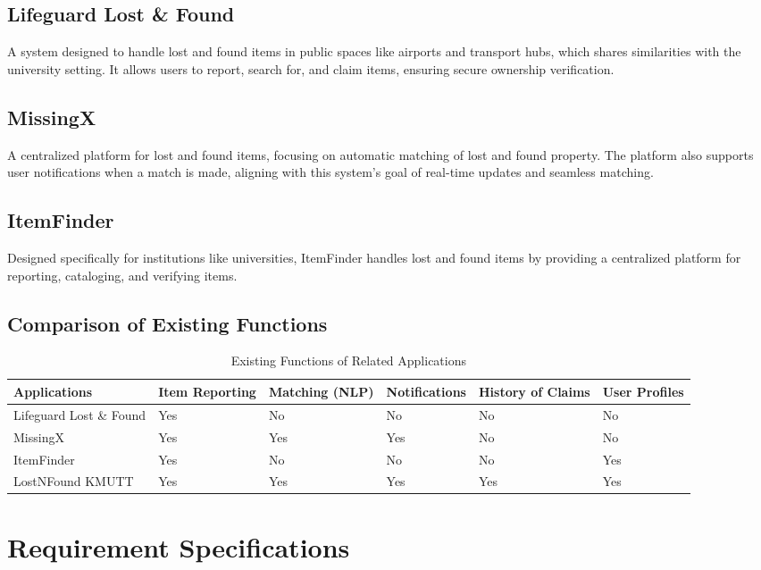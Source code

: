 \subsection{Lifeguard Lost \& Found}
A system designed to handle lost and found items in public spaces like airports and transport hubs, which shares similarities with the university setting. It allows users to report, search for, and claim items, ensuring secure ownership verification.

\subsection{MissingX}
A centralized platform for lost and found items, focusing on automatic matching of lost and found property. The platform also supports user notifications when a match is made, aligning with this system’s goal of real-time updates and seamless matching.

\subsection{ItemFinder}
Designed specifically for institutions like universities, ItemFinder handles lost and found items by providing a centralized platform for reporting, cataloging, and verifying items.

\subsection{Comparison of Existing Functions}
\begin{table}[h!]
\centering

\begin{tabular}{|l|p{1.7cm}|p{1.7cm}|p{2cm}|p{1.7cm}|p{1.7cm}|}
\hline
\textbf{Applications} & \textbf{Item Reporting} & \textbf{Matching (NLP)} & \textbf{Notifications} & \textbf{History of Claims} & \textbf{User Profiles} \\
\hline
Lifeguard Lost \& Found & Yes & No & No & No & No \\
\hline
MissingX & Yes & Yes & Yes & No & No \\
\hline
ItemFinder & Yes & No & No & No & Yes \\
\hline
LostNFound KMUTT & Yes & Yes & Yes & Yes & Yes \\
\hline
\end{tabular}
\caption{Existing Functions of Related Applications}
\end{table}

\section{Requirement Specifications}
